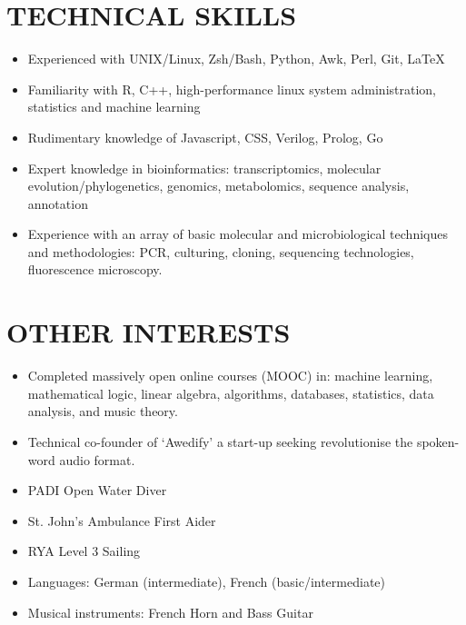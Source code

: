 \documentclass{res}
\begin{document}
\begin{resume}
 \section{TECHNICAL SKILLS}
          \vspace{-1pt}
 \begin{itemize}
\item Experienced with UNIX/Linux, Zsh/Bash, Python, Awk, Perl, Git, \LaTeX
\item Familiarity with R, C++, high-performance linux system administration, statistics and machine learning
\item Rudimentary knowledge of Javascript, CSS, Verilog, Prolog, Go
\item Expert knowledge in bioinformatics: transcriptomics, molecular evolution/phylogenetics, genomics, metabolomics, sequence analysis, annotation
\item Experience with an array of basic molecular and microbiological techniques and methodologies: PCR, culturing, cloning, sequencing technologies, fluorescence microscopy.
    \end{itemize}
	
 \section{OTHER INTERESTS}
          \vspace{-1pt}
 \begin{itemize}
     \item Completed massively open online courses (MOOC) in: machine learning, mathematical logic, linear algebra, algorithms, databases, statistics, data analysis, and music theory.
     \item Technical co-founder of `Awedify' a start-up seeking revolutionise the spoken-word audio format.
     \item PADI Open Water Diver
     \item St. John's Ambulance First Aider
     \item RYA Level 3 Sailing
     \item Languages: German (intermediate), French (basic/intermediate)
     \item Musical instruments: French Horn and Bass Guitar
 \end{itemize}
\end{resume}
\end{document}
